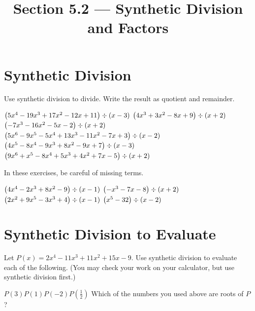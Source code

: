 

\title{Section 5.2 --- Synthetic Division and Factors}


\maketitle

\section*{Synthetic Division}
Use synthetic division to divide. Write the result as quotient and remainder.
\begin{smenum}
\mitemx
{$\left(5x^4-19x^3+17x^2-12x+11\right)\div\left(x-3\right)$}
\mitemx
{$\left(4x^3+3x^2-8x+9\right)\div\left(x+2\right)$}
\mitemx
{$\left(-7x^3-16x^2-5x-2\right)\div\left(x+2\right)$}
\mitemx
{$\left(5x^6-9x^5-5x^4+13x^3-11x^2-7x+3\right)\div\left(x-2\right)$}
\mitemx
{$\left(4x^5-8x^4-9x^3+8x^2-9x+7\right)\div\left(x-3\right)$}
\mitemx
{$\left(9x^6+x^5-8x^4+5x^3+4x^2+7x-5\right)\div\left(x+2\right)$}
\end{smenum}
In these exercises, be careful of missing terms.
\begin{smenum}
\mitemx
{$\left(4x^4-2x^3+8x^2-9\right)\div\left(x-1\right)$}
\mitemx
{$\left(-x^3-7x-8\right)\div\left(x+2\right)$}
\mitemx
{$\left(2x^2+9x^5-3x^3+4\right)\div\left(x-1\right)$}
\mitemx
{$\left(x^5-32\right)\div\left(x-2\right)$}
\end{smenum}

\section*{Synthetic Division to Evaluate}
Let $P(x)=2x^4-11x^3+11x^2+15x-9$. Use synthetic division to evaluate each of the following. (You may check your work on your calculator, but use synthetic division first.)
\begin{smenum}
\mitemxxxx
{$P(3)$}{$P(1)$}{$P(-2)$}{$P\left(\frac{1}{2}\right)$}
\mitemx
{Which of the numbers you used above are roots of $P$?}
\end{smenum}


